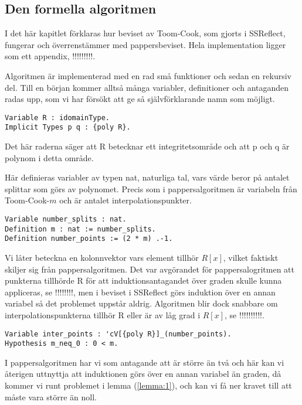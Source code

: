 \subsection{Den formella algoritmen}
I det här kapitlet förklaras hur beviset av Toom-Cook, som gjorts i SSReflect,
fungerar och överrenstämmer med pappersbeviset. Hela implementation ligger som
ett appendix, !!!!!!!!!.

Algoritmen är implementerad med en rad små funktioner och sedan en rekursiv
del. Till en början kommer alltså många variabler, definitioner och antaganden
radas upp, som vi har försökt att ge så självförklarande namn som möjligt.

\begin{lstlisting}
Variable R : idomainType.
Implicit Types p q : {poly R}.
\end{lstlisting}

Det här raderna säger att R betecknar ett integritetsområde och att p och q är
polynom i detta område.

Här definieras variabler av typen nat, naturliga tal, vars värde beror på
antalet splittar som görs av polynomet. Precis som i pappersalgoritmen är 
variabeln från Toom-Cook-$m$ och  är antalet
interpolationspunkter.

\begin{lstlisting}
Variable number_splits : nat.
Definition m : nat := number_splits.
Definition number_points := (2 * m) .-1.
\end{lstlisting}

Vi låter  beteckna en kolonnvektor vars element tillhör $R[x]$,
vilket faktiskt skiljer sig från pappersalgoritmen. Det var avgörandet för
pappersalogritmen att punkterna tillhörde R för att induktionsantagandet över
graden skulle kunna appliceras, se !!!!!!!!, men i beviset i SSReflect görs
induktion över en annan variabel så det problemet uppstår aldrig. Algoritmen
blir dock snabbare om interpolationspunkterna tillhör R eller är av låg grad i
$R[x]$, se !!!!!!!!!!.

\begin{lstlisting}
Variable inter_points : 'cV[{poly R}]_(number_points).
Hypothesis m_neq_0 : 0 < m.
\end{lstlisting}

I pappersalgoritmen har vi som antagande att  är större än två och här kan
vi återigen uttnyttja att induktionen görs över en annan variabel än graden, då
kommer vi runt problemet i lemma (\ref{lemma:1}), och kan vi få ner kravet till
att  måste vara större än noll.

